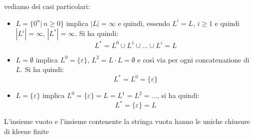 \begin{itemize}
\begin{example}
				\end{example}
				vediamo dei casi particolari:
				\begin{itemize}
					\item $L=\{0^n|\,n\geq 0\}$ implica $|L|=\infty$ e quindi, essendo $L^i=L,\, i\geq 1$ e quindi $|L^i|=\infty$, $|L^*|=\infty$. Si ha quindi:
								$$L^*=L^0\cup L^1\cup ... \cup L^i=L$$
					\item $L=\emptyset$ implica $L^0=\{\varepsilon\}$, $L^2=L\cdot L=\emptyset$ e così via per ogni concatenazione di $L$. Si ha quindi:
								$$L^*=L^0=\{\varepsilon\}$$
					\item $L=\{\varepsilon\}$ implica $L^0=\{\varepsilon\}=L=L^1=L^2=...$, si ha quindi:
								$$L^*=\{\varepsilon\}=L$$
				\end{itemize}
				L'insieme vuoto e l'insieme contenente la stringa vuota hanno le uniche chiusure di kleene finite
\end{itemize}
